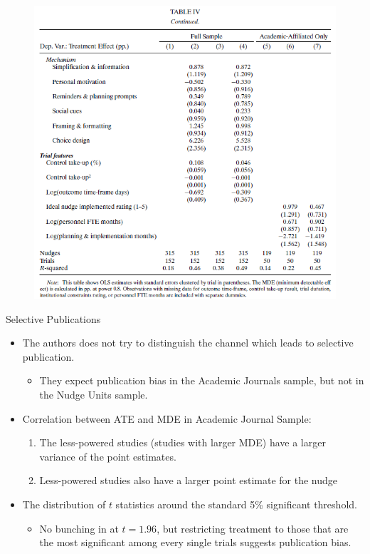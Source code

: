 \documentclass[dvipdfmx,11pt]{beamer}
\begin{document}
\begin{frame}{}
  \begin{figure}
    \centering
    \includegraphics[scale = .5]{fig_tab/os20220412/T4b.png}
  \end{figure}
\end{frame}

\begin{frame}{Selective Publications}
  \begin{itemize}
    \item The authors does not try to distinguish the channel which leads to selective publication.
    \begin{itemize}
      \item They expect publication bias in the Academic Journals sample, but not in the Nudge Units sample.
    \end{itemize}
    \item Correlation between ATE and MDE in Academic Journal Sample:
    \begin{enumerate}
      \item The less-powered studies (studies with larger MDE) have a larger variance of the point estimates.
      \item Less-powered studies also have a larger point estimate for the nudge
    \end{enumerate}
    \item The distribution of $t$ statistics around the standard 5\% significant threshold.
    \begin{itemize}
      \item No bunching in at $t = 1.96$, but restricting treatment to those that are the most significant among every single trials suggests publication bias.
    \end{itemize}
  \end{itemize}
\end{frame}
\end{document}
